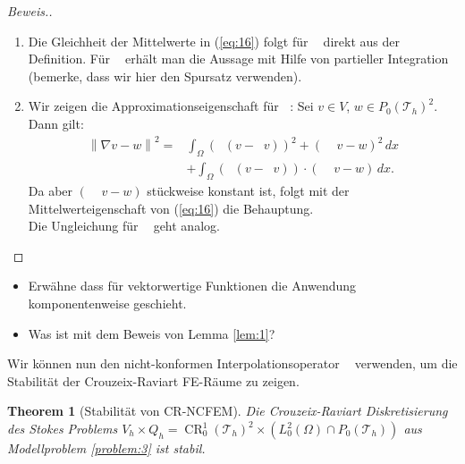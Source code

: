 \documentclass[a4paper]{scrartcl}
\newcommand{\Ltwo}{L^2}
\newcommand{\crfem}{\operatorname{CR}_0^1}
\newcommand{\mesh}{\mathcal{T}_h}
\newcommand{\dx}{\,dx}
\newcommand{\norm}[1]{\left\lVert#1\right\rVert}
\DeclareMathOperator{\nablah}{\nabla_{\textit{h}}}
\DeclareMathOperator{\intOp}{I_{NC}}
\DeclareMathOperator{\LtwoOp}{\Pi_0}
\theoremstyle{plain}
\newtheorem{theorem}{Theorem}
\theoremstyle{definition}
\theoremstyle{remark}
\begin{document}
\begin{proof}[Beweis.]
  \begin{enumerate}[label=\emph{(\roman*)}]
  \item Die Gleichheit der Mittelwerte in (\ref{eq:16}) folgt für
    \(\LtwoOp\) direkt aus der Definition. Für \(\intOp\) erhält man die
    Aussage mit Hilfe von partieller Integration (bemerke, dass wir hier
    den Spursatz verwenden).
  \item Wir zeigen die Approximationseigenschaft für \(\intOp\): Sei
    \(v \in V\), \(w\in P_0(\mesh)^2\). Dann gilt: 
    \begin{align}
      \norm{\nabla v - w}^2 =& \int_\Omega \left(\nablah(v - \intOp v)\right)^2 + \left(\nablah \intOp v - w\right)^2 \dx \nonumber \\ 
      & + \int_\Omega \left(\nablah(v - \intOp v)\right) \cdot \left(\nablah \intOp v - w\right) \dx. \nonumber
    \end{align}
    Da aber \(\left(\nablah \intOp v - w\right)\) stückweise konstant
    ist, folgt mit der Mittelwerteigenschaft von (\ref{eq:16}) die
    Behauptung. \\
    Die Ungleichung für \(\LtwoOp\) geht analog. 
\end{enumerate}
\end{proof}


{\color{red}
  \begin{itemize}
  \item Erwähne dass für vektorwertige Funktionen die Anwendung
    komponentenweise geschieht.
  \item Was ist mit dem Beweis von Lemma \ref{lem:1}? 
  \end{itemize}
}

\noindent Wir können nun den nicht-konformen Interpolationsoperator \(\intOp\)
verwenden, um die Stabilität der Crouzeix-Raviart FE-Räume zu zeigen. 

\begin{theorem}[Stabilität von CR-NCFEM]\label{thm:3}
  Die Crouzeix-Raviart Diskretisierung des Stokes Problems \(V_h \times Q_h =
  \crfem(\mesh)^2 \times (\Ltwo_0(\Omega)\cap P_0(\mesh))\) aus
  Modellproblem \ref{problem:3}  ist stabil. 
\end{theorem}
\end{document}
